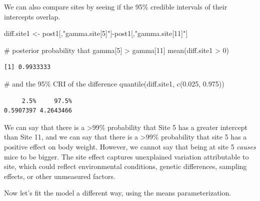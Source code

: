 \documentclass[
  13,
  letterpaper,
]{report}
\newenvironment{Shaded}{\begin{snugshade}}{\end{snugshade}}
\newcommand{\CommentTok}[1]{\textcolor[rgb]{0.37,0.37,0.37}{#1}}
\newcommand{\DecValTok}[1]{\textcolor[rgb]{0.68,0.00,0.00}{#1}}
\newcommand{\FloatTok}[1]{\textcolor[rgb]{0.68,0.00,0.00}{#1}}
\newcommand{\FunctionTok}[1]{\textcolor[rgb]{0.28,0.35,0.67}{#1}}
\newcommand{\NormalTok}[1]{\textcolor[rgb]{0.00,0.23,0.31}{#1}}
\newcommand{\OtherTok}[1]{\textcolor[rgb]{0.00,0.23,0.31}{#1}}
\newcommand{\SpecialCharTok}[1]{\textcolor[rgb]{0.37,0.37,0.37}{#1}}
\newcommand{\StringTok}[1]{\textcolor[rgb]{0.13,0.47,0.30}{#1}}
\begin{document}
We can also compare sites by seeing if the 95\% credible intervals of
their intercepts overlap.

\begin{Shaded}
\begin{Highlighting}[]
\NormalTok{diff.site1 }\OtherTok{\textless{}{-}}\NormalTok{ post1[,}\StringTok{"gamma.site[5]"}\NormalTok{]}\SpecialCharTok{{-}}\NormalTok{post1[,}\StringTok{"gamma.site[11]"}\NormalTok{]}

\CommentTok{\# posterior probability that gamma[5] \textgreater{} gamma[11]}
\FunctionTok{mean}\NormalTok{(diff.site1 }\SpecialCharTok{\textgreater{}} \DecValTok{0}\NormalTok{)}
\end{Highlighting}
\end{Shaded}

\begin{verbatim}
[1] 0.9933333
\end{verbatim}

\begin{Shaded}
\begin{Highlighting}[]
\CommentTok{\# and the 95\% CRI of the difference}
\FunctionTok{quantile}\NormalTok{(diff.site1, }\FunctionTok{c}\NormalTok{(}\FloatTok{0.025}\NormalTok{, }\FloatTok{0.975}\NormalTok{))}
\end{Highlighting}
\end{Shaded}

\begin{verbatim}
     2.5%     97.5% 
0.5907397 4.2643466 
\end{verbatim}

We can say that there is a \textgreater99\% probability that Site 5 has
a greater intercept than Site 11, and we can say that there is a
\textgreater99\% probability that site 5 has a positive effect on body
weight. However, we cannot say that being at site 5 \emph{causes} mice
to be bigger. The site effect captures unexplained variation
attributable to site, which could reflect environmental conditions,
genetic differences, sampling effects, or other unmeasured factors.

Now let's fit the model a different way, using the means
parameterization.
\end{document}
